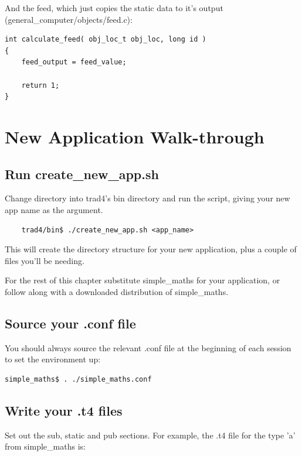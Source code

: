 \documentclass{report}
\begin{document}
And the feed, which just copies the static data to it's output (general_computer/objects/feed.c):

\begin{verbatim}
int calculate_feed( obj_loc_t obj_loc, long id )
{
    feed_output = feed_value;

    return 1;
}
\end{verbatim}









\chapter{New Application Walk-through}

\section{Run create_new_app.sh}

Change directory into trad4's bin directory and run the script, giving your new app name as the argument.

\begin{verbatim}
    trad4/bin$ ./create_new_app.sh <app_name>
\end{verbatim}

This will create the directory structure for your new application, plus a couple of files you'll be needing.

For the rest of this chapter substitute simple_maths for your application, or follow along with a downloaded  distribution of simple_maths.

\section{Source your .conf file}

You should always source the relevant .conf file at the beginning of each session to set the environment  up:

\begin{verbatim}
simple_maths$ . ./simple_maths.conf
\end{verbatim}

\section{Write your .t4 files}

Set out the sub, static and pub sections. For example, the .t4 file for the type 'a' from simple_maths is:
\end{document}
